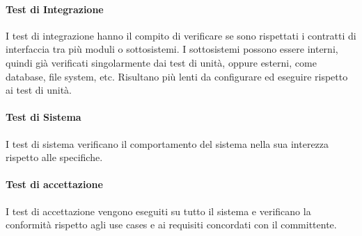 \paragraph{Test di Integrazione}
I test di integrazione hanno il compito di verificare se sono rispettati i contratti di interfaccia tra più moduli o sottosistemi. I sottosistemi possono essere interni, quindi già verificati singolarmente dai test di unità, oppure esterni, come database, file system, etc. 
Risultano più lenti da configurare ed eseguire rispetto ai test di unità.  
\paragraph{Test di Sistema}
I test di sistema verificano il comportamento del sistema nella sua interezza rispetto alle specifiche. 
\paragraph{Test di accettazione}
I test di accettazione vengono eseguiti su tutto il sistema e verificano la conformità rispetto agli use cases e ai requisiti concordati con il committente.
